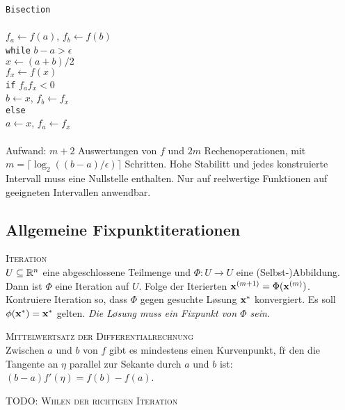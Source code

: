\verb!Bisection!\\
{\addtolength{\leftskip}{0mm}
\hrulefill\\
$f_a \leftarrow f(a)$, $f_b \leftarrow f(b)$\\
\verb!while! $b-a>\epsilon$\\
\quad $x \leftarrow (a+b)/2$ \\
\quad $f_x \leftarrow f(x)$ \\
\quad \verb!if! $f_af_x < 0$ \\ 
\qquad $b \leftarrow x$, $f_b \leftarrow f_x$ \\
\quad \verb!else! \\
\qquad $a \leftarrow x$, $f_a \leftarrow f_x$ \\
\hrulefill\\
}
Aufwand: $m+2$ Auswertungen von $f$ und $2m$ Rechenoperationen, mit $m=\lceil \log_2((b-a)/\epsilon)\rceil$ Schritten. Hohe Stabilit\a t und jedes konstruierte Intervall muss eine Nullstelle enthalten. Nur auf reelwertige Funktionen auf geeigneten Intervallen anwendbar.

\subsection{Allgemeine Fixpunktiterationen}
\textsc{Iteration}\\
$U \subseteq \mathbb{R}^{n}$ eine abgeschlossene Teilmenge und $\Phi: U \rightarrow U$ eine (Selbst-)Abbildung. Dann ist $\Phi$ eine Iteration auf $U$. Folge der Iterierten $\mbox{\bf x}^{(m+1)} = \Phi(\mbox{\bf x}^{(m)})$. Kontruiere Iteration so, dass $\Phi$ gegen gesuchte L\o sung $\mbox{\bf x}^*$ konvergiert. Es soll $\phi(\mbox{\bf x}^*) = \mbox{\bf x}^*$ gelten. \emph{Die L\o sung muss ein Fixpunkt von $\Phi$ sein.}\vspace{0.2cm}

\textsc{Mittelwertsatz der Differentialrechnung}\\
Zwischen $a$ und $b$ von $f$ gibt es mindestens einen Kurvenpunkt, f\u r den die Tangente an $\eta$ parallel zur Sekante durch $a$ und $b$ ist:
$(b-a)f'(\eta) = f(b)-f(a)$. \vspace{0.2cm}

\textsc{TODO: W\a hlen der richtigen Iteration}\\

